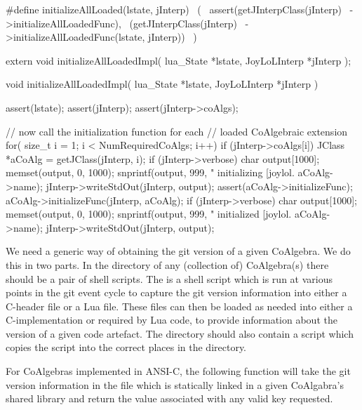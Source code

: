 \startCHeader
#define initializeAllLoaded(lstate, jInterp)      \
  (                                               \
    assert(getJInterpClass(jInterp)               \
      ->initializeAllLoadedFunc),                 \
    (getJInterpClass(jInterp)                     \
      ->initializeAllLoadedFunc(lstate, jInterp)) \
  )
\stopCHeader

\setCHeaderStream{private}
\startCHeader
extern void initializeAllLoadedImpl(
  lua_State    *lstate,
  JoyLoLInterp *jInterp
);
\stopCHeader
{}

\startCCode
void initializeAllLoadedImpl(
  lua_State    *lstate,
  JoyLoLInterp *jInterp
) {
  assert(lstate);
  assert(jInterp);
  assert(jInterp->coAlgs);
  
  // now call the initialization function for each 
  // loaded CoAlgebraic extension
  for( size_t i = 1; i < NumRequiredCoAlgs; i++) {
    if (jInterp->coAlgs[i]) {
      JClass *aCoAlg = getJClass(jInterp, i);
      if (jInterp->verbose) {
        char output[1000];
        memset(output, 0, 1000);
        snprintf(output, 999, 
          "    initializing [joylol.%
          aCoAlg->name);
        jInterp->writeStdOut(jInterp, output);
      }
      assert(aCoAlg->initializeFunc);
      aCoAlg->initializeFunc(jInterp, aCoAlg);
      if (jInterp->verbose) {
        char output[1000];
        memset(output, 0, 1000);
        snprintf(output, 999, 
          "    initialized [joylol.%
          aCoAlg->name);
        jInterp->writeStdOut(jInterp, output);
      }
    }
  }
}
\stopCCode

\stopTestSuite

\startTestSuite[getGitVersion]

We need a generic way of obtaining the git version of a given CoAlgebra. 
We do this in two parts. In the  directory of any (collection 
of) CoAlgebra(s) there should be a pair of shell scripts. The 
 is a  shell script which is run at various 
points in the git event cycle to capture the git version information into 
either a C-header file or a Lua file. These files can then be loaded as 
needed into either a C-implementation or required by Lua code, to provide 
information about the version of a given code artefact. The \type{bin} 
directory should also contain a \type{setupGitHooks}  script 
which copies the \type{gitHook.sh} script into the correct places in the 
\type{.git} directory. 

For CoAlgebras implemented in ANSI-C, the following function will take the 
git version information in the \type{gitVersion.h} file which is 
statically linked in a given CoAlgabra's shared library and return the 
value associated with any valid key requested. 

